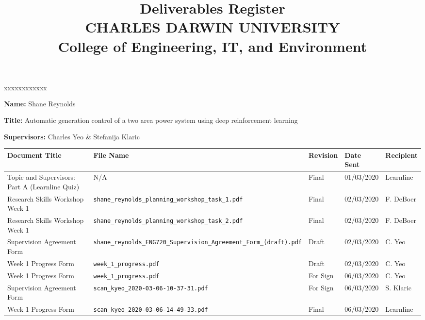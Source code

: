 \documentclass[10pt, landscape]{article}
\title{	
		Deliverables Register\\
		CHARLES DARWIN UNIVERSITY\\
		College of Engineering, IT, and Environment
	  }
\author{}
\date{}
\begin{document}
	
	\maketitle
	
	\begin{namelist}{xxxxxxxxxxxx}
		\item[{\bf Name:}]
			Shane Reynolds
		\item[{\bf Title:}]
			Automatic generation control of a two area power system using deep reinforcement learning
		\item[{\bf Supervisors:}]
			Charles Yeo \& Stefanija Klaric
	\end{namelist}
	
	\small
	\begin{tabular}{p{7cm}p{10cm}p{1.5cm}p{2cm}p{2cm}}
	\toprule
	\textbf{Document Title}							& \textbf{File Name}				& \textbf{Revision} & \textbf{Date Sent} 	& \textbf{Recipient} \\
	\midrule
	Topic and Supervisors: Part A (Learnline Quiz)	& N/A																		& Final 			& 01/03/2020		 	& Learnline\\
	
	Research Skills Workshop Week 1					& \verb|shane_reynolds_planning_workshop_task_1.pdf|						& Final				& 02/03/2020		 	& F. DeBoer\\
	
	Research Skills Workshop Week 1					& \verb|shane_reynolds_planning_workshop_task_2.pdf|						& Final				& 02/03/2020			& F. DeBoer\\
	
	Supervision Agreement Form						& \verb|shane_reynolds_ENG720_Supervision_Agreement_Form_(draft).pdf|		& Draft				& 02/03/2020			& C. Yeo\\
	
	Week 1 Progress Form							& \verb|week_1_progress.pdf|												& Draft				& 02/03/2020			& C. Yeo\\
	
	Week 1 Progress Form							& \verb|week_1_progress.pdf|												& For Sign			& 06/03/2020			& C. Yeo\\
	
	Supervision Agreement Form						& \verb|scan_kyeo_2020-03-06-10-37-31.pdf|									& For Sign			& 06/03/2020			& S. Klaric\\
	
	Week 1 Progress Form							& \verb|scan_kyeo_2020-03-06-14-49-33.pdf|									& Final				& 06/03/2020			& Learnline\\
	

\end{tabular}
\end{document}
